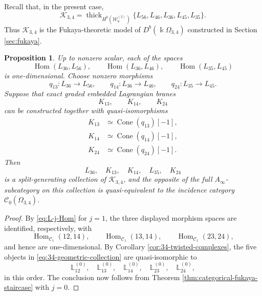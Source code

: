 \documentclass[12pt,a4paper,english,reqno]{amsart}
\theoremstyle{plain}
\newtheorem{proposition}[theorem]{Proposition}
\theoremstyle{definition}
\newcommand{\Hom}{\operatorname{Hom}}
\newcommand{\C}{\mathcal C}
\begin{document}
Recall that, in the present case,
\[
\mathcal K_{3,4}
=
\operatorname{thick}_{H^0(\mathcal W_6^{(2)})}
\{L_{56},L_{46},L_{36},L_{45},L_{35}\}.
\]
Thus $\mathcal K_{3,4}$ is the Fukaya-theoretic model of
$D^b(\Bbbk\Omega_{3,4})$ constructed in Section \ref{sec:fukaya}.

\begin{proposition}
\label{prop:34-geometric-reduction}
Up to nonzero scalar, each of the spaces
\[
 \Hom(L_{36},L_{56}),\qquad
 \Hom(L_{36},L_{46}),\qquad
 \Hom(L_{35},L_{45})
\]
is one-dimensional.  Choose nonzero morphisms
\[
 q_{13}\colon L_{36}\longrightarrow L_{56},\qquad
 q_{14}\colon L_{36}\longrightarrow L_{46},\qquad
 q_{24}\colon L_{35}\longrightarrow L_{45}.
\]
Suppose that exact graded embedded Lagrangian branes
\[
 K_{13},\qquad K_{14},\qquad K_{24}
\]
can be constructed together with quasi-isomorphisms
\[
\begin{aligned}
 K_{13}&\simeq\operatorname{Cone}(q_{13})[-1],\\
 K_{14}&\simeq\operatorname{Cone}(q_{14})[-1],\\
 K_{24}&\simeq\operatorname{Cone}(q_{24})[-1].
\end{aligned}
\]
Then
\begin{equation}
 L_{36},\quad K_{13},\quad K_{14},\quad
 L_{35},\quad K_{24}
\label{eq:34-geometric-collection}
\end{equation}
is a split-generating collection of $\mathcal K_{3,4}$, and the opposite of
the full $A_\infty$-subcategory on this collection is quasi-equivalent to the
incidence category
$\C_0(\Omega_{3,4})$.
\end{proposition}

\begin{proof}
By \eqref{eq:L-j-Hom} for $j=1$, the three displayed morphism spaces are
identified, respectively, with
\[
 \Hom_{\C_1}(12,14),\qquad
 \Hom_{\C_1}(13,14),\qquad
 \Hom_{\C_1}(23,24),
\]
and hence are one-dimensional.  By
Corollary \ref{cor:34-twisted-complexes}, the five objects in
\eqref{eq:34-geometric-collection} are quasi-isomorphic to
\[
 \mathbb L_{12}^{(0)},\quad
 \mathbb L_{13}^{(0)},\quad
 \mathbb L_{14}^{(0)},\quad
 \mathbb L_{23}^{(0)},\quad
 \mathbb L_{24}^{(0)},
\]
in this order.  The conclusion now follows from
Theorem \ref{thm:categorical-fukaya-staircase} with $j=0$.
\end{proof}
\end{document}
